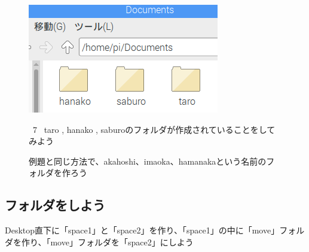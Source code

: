 \documentclass[a4paper,12pt]{jarticle}
\begin{document}
\begin{figure}
  \centering
  \includegraphics[width=8.359cm]{textbook-img043.png}
  \begin{minipage}{\textwidth}
    \ 7 \ taro , hanako ,
    saburoのフォルダが作成されていることをしてみよう
  \end{minipage}
  \vspace{10mm}
  \flushleft
  \theQuestion\label{Q:hasAnswer02-1}

  例題と同じ方法で、akahoshi、imaoka、hamanakaという名前のフォルダを作ろう

\end{figure}
\clearpage
{}
\subsection{\theExercise フォルダをしよう}
Desktop直下に「space1」と「space2」を作り、「space1」の中に「move」フォルダを作り、「move」フォルダを「space2」にしよう

\end{document}
